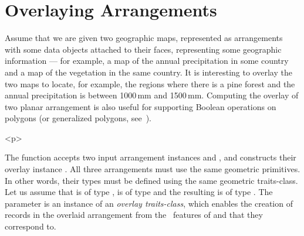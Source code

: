 
\section{Overlaying Arrangements}
\label{arr_sec:overlay}
%
Assume that we are given two geographic maps, represented as
arrangements with some data objects attached to their faces,
representing some geographic information --- for example, a map of
the annual precipitation in some country and a map of the vegetation
in the same country. It is interesting to overlay the two maps to
locate, for example, the regions where there is a pine forest and
the annual precipitation is between 1000\,mm and 1500\,mm. Computing
the overlay of two planar arrangement is also useful for supporting
Boolean operations on polygons (or generalized polygons,
see~\cite{behsms-cbcab-02}).

\begin{ccHtmlOnly}<p>\end{ccHtmlOnly}
The function  accepts
two input arrangement instances  and , and constructs
their overlay instance . All three arrangements must use the
same geometric primitives. In other words, their types must be defined 
using the same geometric traits-class. Let us assume that  is of 
type ,  is of type
 and the resulting  is of type 
. The  parameter is
an instance of an {\em overlay traits-class}, which enables the creation of
 records in the overlaid arrangement from the \dcel\ features
of  and  that they correspond to.

